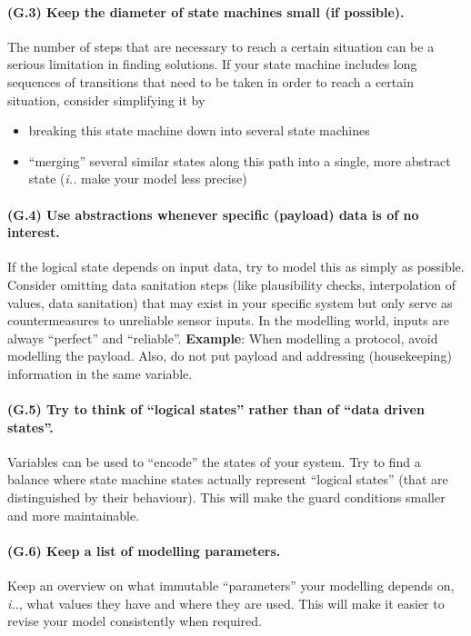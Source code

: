 \paragraph{(G.3) Keep the diameter of state machines small (if possible).}
The number of steps that are necessary to reach a certain situation can be a
serious limitation in finding solutions.  If your state machine includes long sequences of transitions that need to be
taken in order to reach a certain situation, consider simplifying it by
\begin{itemize}
\item breaking this state machine down into several state machines
\item ``merging'' several similar states along this path into a single, more
  abstract state (\emph{i.\@e.\@} make your model less precise)
\end{itemize}
%
\paragraph{(G.4) Use abstractions whenever specific (payload) data is of no interest.}
If the logical state depends on input data, try to model this as simply as
possible. Consider omitting data sanitation steps (like plausibility checks,
interpolation of values, data sanitation) that may exist in your specific
system but only serve as countermeasures to unreliable sensor inputs. In the
modelling world, inputs are always ``perfect'' and ``reliable''.
{\bf Example}: When modelling a protocol, avoid modelling the payload. Also, do not put payload and addressing (housekeeping) information in the
same variable.
%
\paragraph{(G.5) Try to think of ``logical states'' rather than of ``data driven states''.}
Variables can be used to ``encode'' the states of your system. Try to find a
balance where state machine states actually represent ``logical states'' (that
are distinguished by their behaviour). This will make the guard conditions
smaller and more maintainable.
%
\paragraph{(G.6) Keep a list of modelling parameters.}
Keep an overview on what immutable ``parameters'' your modelling depends on,
\emph{i.\@e.\@}, what values they have and where they are used.
This will make it easier to revise your model consistently when required.
%

